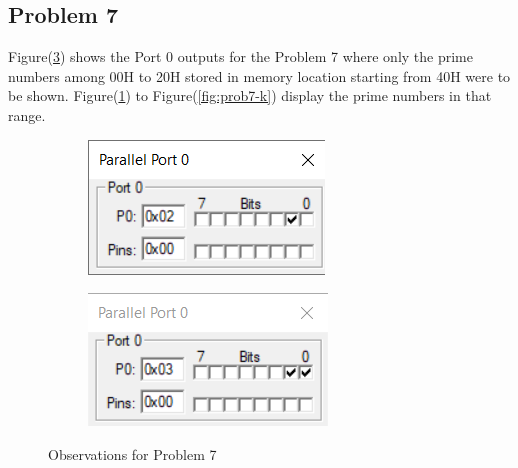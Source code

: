 \documentclass{lab_sheet}
\begin{document}
\subsection*{Problem 7}
Figure(\ref{fig:prob7}) shows the Port 0 outputs for the Problem 7 where only the prime numbers among 00H to 20H stored in memory location starting from 40H were to be shown. Figure(\ref{fig:prob7-a}) to Figure(\ref{fig:prob7-k}) display the prime numbers in that range.
\begin{figure}[H]
\begin{subfigure}{.5\textwidth}
  \centering
  \includegraphics[frame,width=.8\linewidth]{../Figures/1_7_a.png}  
  \caption{}
   \label{fig:prob7-a}
\end{subfigure}
\begin{subfigure}{.5\textwidth}
  \centering
  \includegraphics[frame,width=.8\linewidth]{../Figures/1_7_b.png}  
  \caption{}
  \label{fig:prob7-b}
\end{subfigure}
\caption{Observations for Problem 7}
\label{fig:prob7}
\end{figure}
\end{document}
